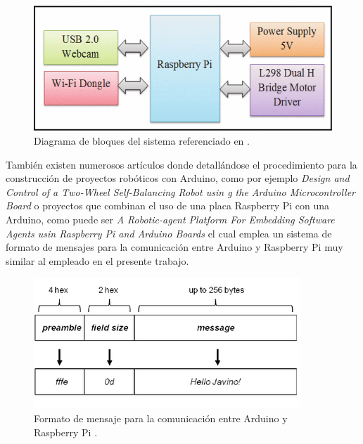 \begin{figure}[H]
  \begin{center}
    \includegraphics[scale=0.4]{imagenes/esquema_articulo.png}
  \end{center}
  \label{fig:esquema_articulo}
 \caption{Diagrama de bloques del sistema referenciado en \cite{article:3}.}
\end{figure}
  
  
También existen numerosos artículos donde detallándose el procedimiento para la construcción de proyectos robóticos con Arduino, como por ejemplo \emph{Design and Control of a Two-Wheel Self-Balancing Robot usin
g the Arduino Microcontroller Board} \cite{article-4} o proyectos que combinan el uso de una placa Raspberry Pi con una Arduino, como puede ser \emph{A Robotic-agent Platform For Embedding Software Agents usin Raspberry Pi and Arduino Boards} \cite{article:5} el cual
emplea un sistema de formato de mensajes para la comunicación entre Arduino y Raspberry Pi muy similar al empleado en el presente trabajo.\\
  
\begin{figure}[H]
  \begin{center}
    \includegraphics[scale=0.8]{imagenes/mensaje_formato.png}
  \end{center}
  \label{fig:mensaje_formato}
 \caption{Formato de mensaje para la comunicación entre Arduino y Raspberry Pi \cite{article:5}.}
\end{figure}
  
